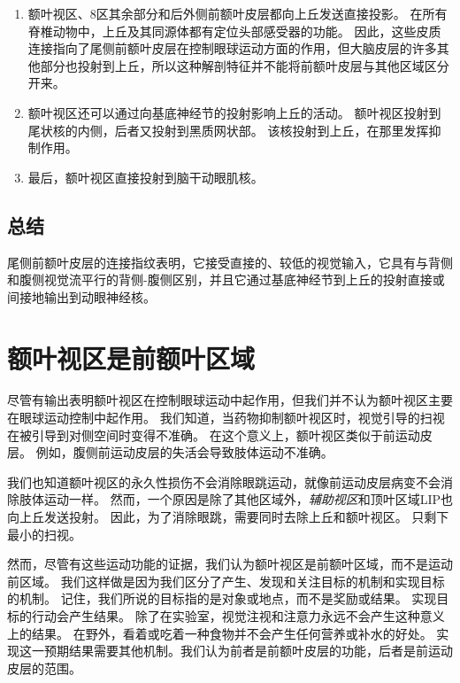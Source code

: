 \begin{enumerate}
	\item 额叶视区\cite{kunzle1976projection,huerta1986frontal}、8区其余部分\cite{fries1984cortical}和后外侧前额叶皮层\cite{selemon1988common}都向上丘发送直接投影。
	在所有脊椎动物中，上丘及其同源体都有定位头部感受器的功能。
	因此，这些皮质连接指向了尾侧前额叶皮层在控制眼球运动方面的作用，但大脑皮层的许多其他部分也投射到上丘\cite{leichnetz1981prefrontal,fries1984cortical}，所以这种解剖特征并不能将前额叶皮层与其他区域区分开来。
	\item 额叶视区还可以通过向基底神经节的投射影响上丘的活动。
	额叶视区投射到尾状核的内侧\cite{stanton1988frontal}，后者又投射到黑质网状部\cite{hedreen1991organization}。
	该核投射到上丘，在那里发挥抑制作用\cite{hikosaka1985modification}。
	\item 最后，额叶视区直接投射到脑干动眼肌核\cite{segraves1992activity,yan2001overlap}。
\end{enumerate}



\subsection{总结}

尾侧前额叶皮层的连接指纹表明，它接受直接的、较低的视觉输入，它具有与背侧和腹侧视觉流平行的背侧-腹侧区别，并且它通过基底神经节到上丘的投射直接或间接地输出到动眼神经核。



\section{额叶视区是前额叶区域}

尽管有输出表明额叶视区在控制眼球运动中起作用，但我们并不认为额叶视区主要在眼球运动控制中起作用。
我们知道，当药物抑制额叶视区时，视觉引导的扫视在被引导到对侧空间时变得不准确\cite{sommer1997reversible}。
在这个意义上，额叶视区类似于前运动皮层。
例如，腹侧前运动皮层的失活会导致肢体运动不准确\cite{kurata1994differential}。


我们也知道额叶视区的永久性损伤不会消除眼跳运动，就像前运动皮层病变不会消除肢体运动一样。
然而，一个原因是除了其他区域外，\textit{辅助视区}\cite{huerta1990supplementary}和顶叶区域LIP\cite{holloway2002brief}也向上丘发送投射。
因此，为了消除眼跳，需要同时去除上丘和额叶视区\cite{schiller1979effects,schiller1987effect}。
只剩下最小的扫视。


然而，尽管有这些运动功能的证据，我们认为额叶视区是前额叶区域，而不是运动前区域。
我们这样做是因为我们区分了产生、发现和关注目标的机制和实现目标的机制。
记住，我们所说的目标指的是对象或地点，而不是奖励或结果。
实现目标的行动会产生结果。
除了在实验室，视觉注视和注意力永远不会产生这种意义上的结果。
在野外，看着或吃着一种食物并不会产生任何营养或补水的好处。
实现这一预期结果需要其他机制。我们认为前者是前额叶皮层的功能，后者是前运动皮层的范围。



